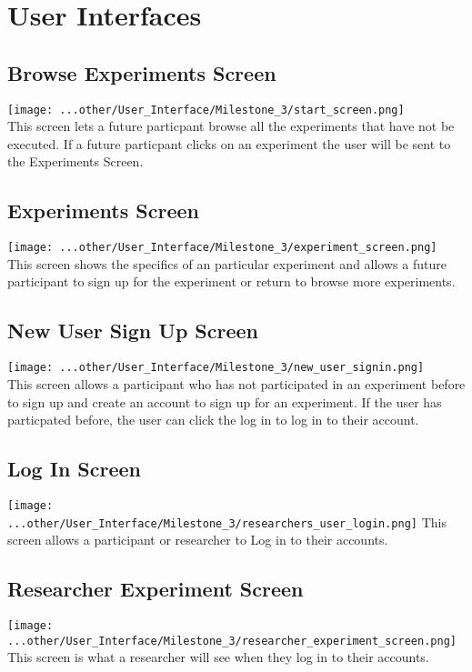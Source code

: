 \section{User Interfaces}
\subsection{Browse Experiments Screen}
\texttt{[image: ...other/User\_Interface/Milestone\_3/start\_screen.png]}\\
This screen lets a future particpant browse all the experiments that have not be executed.  If a future particpant clicks on an experiment the user will be sent to the Experiments Screen.

\subsection{Experiments Screen}
\texttt{[image: ...other/User\_Interface/Milestone\_3/experiment\_screen.png]}\\
This screen shows the specifics of an particular experiment and allows a future participant to sign up for the experiment or return to browse more experiments.

\subsection{New User Sign Up Screen}
\texttt{[image: ...other/User\_Interface/Milestone\_3/new\_user\_signin.png]}\\
This screen allows a participant who has not participated in an experiment before to sign up and create an account to sign up for an experiment.  If the user has particpated before, the user can click the log in to log in to their account.

\subsection{Log In Screen}
\texttt{[image: ...other/User\_Interface/Milestone\_3/researchers\_user\_login.png]}
This screen allows a participant or researcher to Log in to their accounts.

\subsection{Researcher Experiment Screen}
\texttt{[image: ...other/User\_Interface/Milestone\_3/researcher\_experiment\_screen.png]}
This screen is what a researcher will see when they log in to their accounts.

